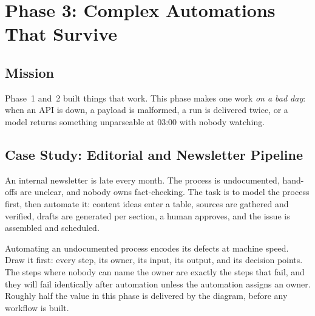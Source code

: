 \section{Phase 3: Complex Automations That Survive}

\subsection{Mission}

Phase~1 and~2 built things that work. This phase makes one work \emph{on a bad
day}: when an API is down, a payload is malformed, a run is delivered twice,
or a model returns something unparseable at 03:00 with nobody watching.

\subsection{Case Study: Editorial and Newsletter Pipeline}

An internal newsletter is late every month. The process is undocumented,
hand-offs are unclear, and nobody owns fact-checking. The task is to model the
process first, then automate it: content ideas enter a table, sources are
gathered and verified, drafts are generated per section, a human approves, and
the issue is assembled and scheduled.

\begin{engineernote}
Automating an undocumented process encodes its defects at machine speed. Draw
it first: every step, its owner, its input, its output, and its decision
points. The steps where nobody can name the owner are exactly the steps that
fail, and they will fail identically after automation unless the automation
assigns an owner. Roughly half the value in this phase is delivered by the
diagram, before any workflow is built.
\end{engineernote}

